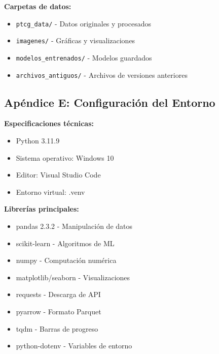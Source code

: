 \documentclass[12pt,letterpaper]{article}
\begin{document}
\textbf{Carpetas de datos:}
\begin{itemize}
    \item \texttt{ptcg\_data/} - Datos originales y procesados
    \item \texttt{imagenes/} - Gráficas y visualizaciones
    \item \texttt{modelos\_entrenados/} - Modelos guardados
    \item \texttt{archivos\_antiguos/} - Archivos de versiones anteriores
\end{itemize}

\subsection{Apéndice E: Configuración del Entorno}

\textbf{Especificaciones técnicas:}
\begin{itemize}
    \item Python 3.11.9
    \item Sistema operativo: Windows 10
    \item Editor: Visual Studio Code
    \item Entorno virtual: .venv
\end{itemize}

\textbf{Librerías principales:}
\begin{itemize}
    \item pandas 2.3.2 - Manipulación de datos
    \item scikit-learn - Algoritmos de ML
    \item numpy - Computación numérica
    \item matplotlib/seaborn - Visualizaciones
    \item requests - Descarga de API
    \item pyarrow - Formato Parquet
    \item tqdm - Barras de progreso
    \item python-dotenv - Variables de entorno
\end{itemize}
\end{document}
